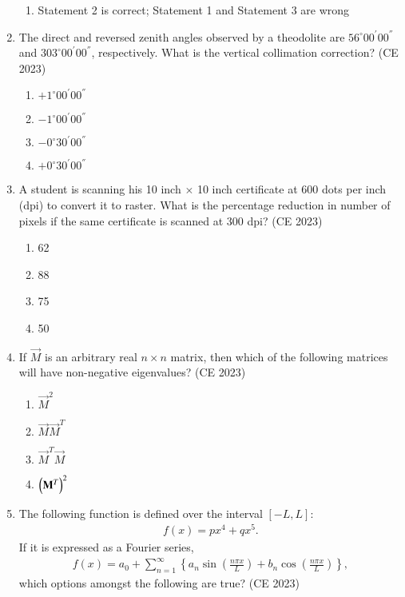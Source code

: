 \documentclass[journal,12pt,onecolumn]{IEEEtran}
\theoremstyle{remark}
\begin{document}
\begin{enumerate}
\begin{enumerate}
\item Statement 2 is correct; Statement 1 and Statement 3 are wrong
\end{enumerate}
\item The direct and reversed zenith angles observed by a theodolite are $56^{\circ} 00^{'} 00^{''}$ and
$303^{\circ} 00^{'} 00^{''}$, respectively. What is the vertical collimation correction?
\hfill{(CE 2023)}
\begin{enumerate}
\item $+1^{\circ} 00^{'} 00^{''}$
\item $-1^{\circ} 00^{'} 00^{''}$
\item $-0^{\circ} 30^{'} 00^{''}$
\item $+0^{\circ} 30^{'} 00^{''}$
\end{enumerate}
\item  A student is scanning his 10 inch $\times$ 10 inch certificate at 600 dots per inch (dpi) to
convert it to raster. What is the percentage reduction in number of pixels if the same
certificate is scanned at 300 dpi?
\hfill{(CE 2023)}
\begin{enumerate}
\item 62
\item 88
\item 75
\item 50
\end{enumerate}
\item If $\vec{M}$ is an arbitrary real $n\times n$ matrix, then which of the following matrices will
have non-negative eigenvalues?
\hfill{(CE 2023)}
\begin{enumerate}
\item $\vec{M}^2$
\item $\vec{M}\vec{M}^T$
\item $\vec{M}^T\vec{M}$
\item $\left(\mathbf{M}^T\right)^2$
\end{enumerate}
\item The following function is defined over the interval $[-L, L]$:
\begin{align}
f(x) = px^4 + qx^5.
\end{align}
If it is expressed as a Fourier series,
\begin{align}
f(x) = a_0 + \sum_{n=1}^{\infty} \left\{ a_n \sin\left(\frac{n\pi x}{L}\right) + b_n \cos\left(\frac{n\pi x}{L}\right) \right\},
\end{align}
which options amongst the following are true?
\hfill{(CE 2023)}
\begin{enumerate}

\end{enumerate}
\end{enumerate}
\end{document}
